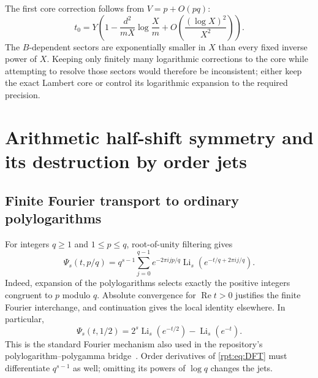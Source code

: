 \documentclass[11pt,a4paper]{article}
\numberwithin{equation}{section}
\theoremstyle{definition}\newtheorem{definition}[theorem]{Definition}
\theoremstyle{remark}\newtheorem{remark}[theorem]{Remark}
\newcommand{\Li}{\operatorname{Li}}
\DeclareMathOperator{\Repart}{Re}
\begin{document}
The first core correction follows from $V=p+O(pq)$:
\begin{equation}
t_0=Y\left(1-\frac{d^2}{mX}\log\frac Xm
+O\left(\frac{(\log X)^2}{X^2}\right)\right).
\label{rpt:eq:corefirst}
\end{equation}
The $B$-dependent sectors are exponentially smaller in $X$ than every fixed inverse power of $X$. Keeping only finitely many logarithmic corrections to the core while attempting to resolve those sectors would therefore be inconsistent; either keep the exact Lambert core or control its logarithmic expansion to the required precision.

\section{Arithmetic half-shift symmetry and its destruction by order jets}
\label{rpt:sec:arithmetic}

\subsection{Finite Fourier transport to ordinary polylogarithms}

For integers $q\ge1$ and $1\le p\le q$, root-of-unity filtering gives
\begin{equation}
\Psi_s(t,p/q)=q^{s-1}\sum_{j=0}^{q-1}
 e^{-2\pi i jp/q}\Li_s(e^{-t/q+2\pi i j/q}).
\label{rpt:eq:DFT}
\end{equation}
Indeed, expansion of the polylogarithms selects exactly the positive integers congruent to $p$ modulo $q$. Absolute convergence for $\Repart t>0$ justifies the finite Fourier interchange, and continuation gives the local identity elsewhere. In particular,
\begin{equation}
\Psi_s(t,1/2)=2^s\Li_s(e^{-t/2})-\Li_s(e^{-t}).
\label{rpt:eq:halfLi}
\end{equation}
This is the standard Fourier mechanism also used in the repository's polylogarithm--polygamma bridge~\cite{repoBridge}. Order derivatives of \eqref{rpt:eq:DFT} must differentiate $q^{s-1}$ as well; omitting its powers of $\log q$ changes the jets.
\end{document}
